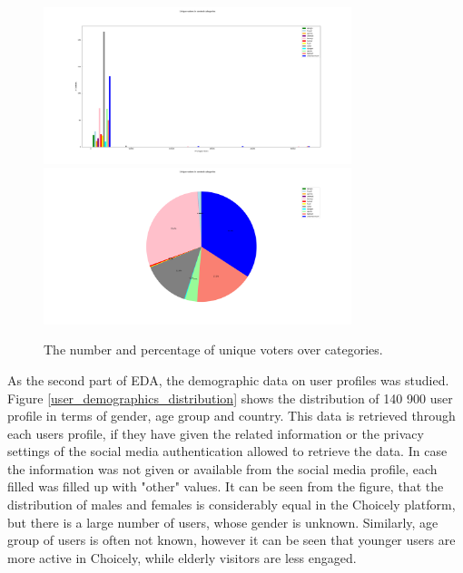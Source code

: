         \begin{figure}[h] 
            \begin{center}
                \includegraphics[width=0.8\textwidth]{Images/user_engagement_in_categories_bar.png}
                \includegraphics[width=0.8\textwidth]{Images/user_engagement_in_categories_pie.png}
                \caption{The number and percentage of unique voters over categories.}
                \label{user_engagement_in_categories}
            \end{center}
        \end{figure}
    
    As the second part of EDA, the demographic data on user profiles was studied. Figure \ref{user_demographics_distribution} shows the distribution of 140 900 user profile in terms of gender, age group and country. This data is retrieved through each users profile, if they have given the related information or the privacy settings of the social media authentication allowed to retrieve the data. In case the information was not given or available from the social media profile, each filled was filled up with "other" values. It can be seen from the figure, that the distribution of males and females is considerably equal in the Choicely platform, but there is a large number of users, whose gender is unknown. Similarly, age group of users is often not known, however it can be seen that younger users are more active in Choicely, while elderly visitors are less engaged. 
    
